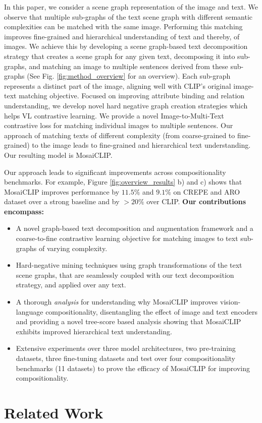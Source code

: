 \documentclass[11pt]{article}
\newcommand{\methodcomp}{MosaiCLIP}
\begin{document}
In this paper, we consider a scene graph representation of the image and text. We observe that multiple sub-graphs of the text scene graph with different semantic complexities can be matched with the same image. Performing this matching improves fine-grained and hierarchical understanding of text and thereby, of images. 
We achieve this by developing a scene graph-based text decomposition strategy that creates a scene graph for any given text, decomposing it into sub-graphs, and matching an image to multiple sentences derived from these sub-graphs (See Fig. \ref{fig:method_overview} for an overview). Each sub-graph represents a distinct part of the image, aligning well with CLIP's original image-text matching objective. Focused on improving {attribute binding} and {relation understanding}, we develop novel hard negative graph creation strategies which helps VL contrastive learning.
We provide a novel Image-to-Multi-Text contrastive loss for matching individual images to multiple sentences. Our approach of matching texts of different complexity (from coarse-grained to fine-grained) to the image leads to fine-grained and hierarchical text understanding. Our resulting model is \methodcomp{}.

Our approach leads to significant improvements across compositionality benchmarks. For example, Figure \ref{fig:overview_results} b) and c) shows that MosaiCLIP improves performance by $11.5\%$ and $9.1\%$ on CREPE and ARO dataset over a strong baseline and by $>20\%$ over CLIP. \textbf{Our contributions encompass:}
\begin{itemize}\item A novel graph-based text decomposition and augmentation framework and a coarse-to-fine contrastive learning objective for matching images to text sub-graphs of varying complexity.
    \item Hard-negative mining techniques using graph transformations of the text scene graphs, that are seamlessly coupled with our text decomposition strategy, and applied over any text. 
    \item A thorough \textit{analysis} for understanding why \methodcomp{} improves vision-language compositionality, disentangling the effect of image and text encoders and providing a novel tree-score based analysis showing that \methodcomp{} exhibits improved hierarchical text understanding.
    \item Extensive experiments over three model architectures, two pre-training datasets, three fine-tuning datasets and test over four compositionality benchmarks (11 datasets) to prove the efficacy of \methodcomp{} for improving compositionality.
\end{itemize} \section{Related Work}
\label{sec_related}
\end{document}

